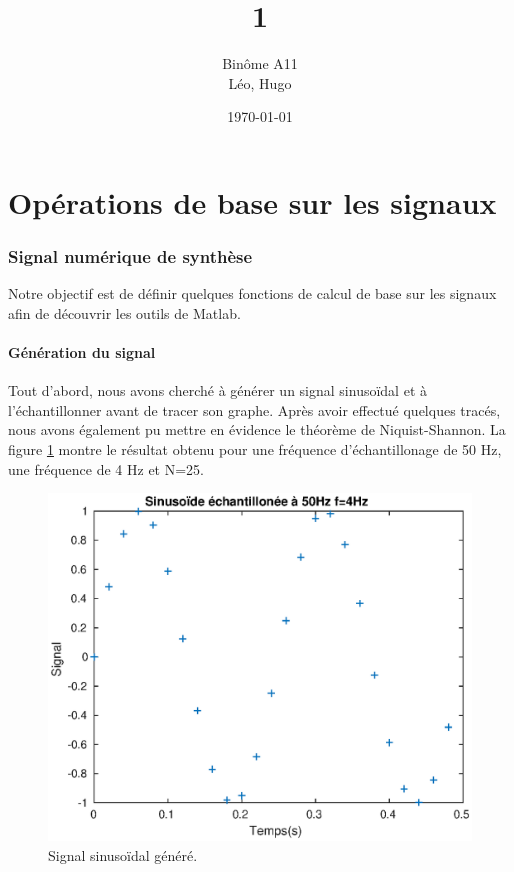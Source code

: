 \documentclass[french]{article}
\title{\bsc{SIG} 1}
\author{Binôme A11 \\ \bsc{Simon} Léo, \bsc{Levy--Falk} Hugo}
\date{\today}
\begin{document}
\maketitle

\tableofcontents
\listoffigures
\newpage


\part{Opérations de base sur les signaux}

\section{Signal numérique de synthèse}

Notre objectif  est de définir quelques fonctions de calcul de base sur les signaux afin de découvrir les outils de Matlab.

\subsection{Génération du signal}

Tout d'abord, nous avons cherché à générer un signal sinusoïdal et à l'échantillonner avant de tracer son graphe. Après avoir effectué quelques tracés, nous avons également pu mettre en évidence le théorème de Niquist-Shannon. La figure \ref{signalSin} montre le résultat obtenu pour une fréquence d'échantillonage de 50 Hz, une fréquence de 4 Hz et N=25.

\begin{figure}[h!]
\centering
\includegraphics{images/signalSinus.eps}
\caption{Signal sinusoïdal généré.}
\label{signalSin}
\end{figure}
\end{document}
